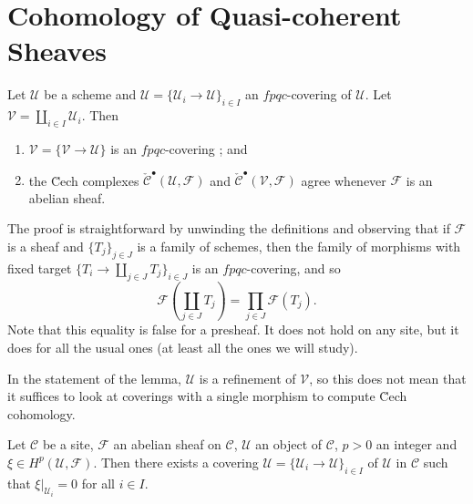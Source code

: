 \section{Cohomology of Quasi-coherent Sheaves}
\label{section-cohomology-quasi-coherent}

\begin{lemma}
\label{lem:CechComplexes}
Let $\mathcal{U}$ be a scheme and $\mathcal{U} = \{ \mathcal{U}_i \to 
\mathcal{U} \}_{i \in I}$ an $fpqc$-covering of $\mathcal{U}$. Let $\mathcal{V} 
= \coprod_{i \in I} \mathcal{U}_i$. Then
\begin{enumerate}
\item 
$\mathcal{V} = \{ \mathcal{V} \to \mathcal{U} \}$ is an $fpqc$-covering ; and
\item
the \u Cech complexes $\check{\mathcal{C}}^\bullet (\mathcal{U}, \mathcal{F})$ 
and $\check{\mathcal{C}}^\bullet (\mathcal{V}, \mathcal{F})$ agree whenever 
$\mathcal{F}$ is an abelian sheaf.
\end{enumerate} 
\end{lemma}

\noindent
The proof is straightforward by unwinding the definitions and observing that if 
$\mathcal{F}$ is a sheaf and $\{ T_j \}_{j \in J}$ is a family of schemes, then 
the family of morphisms with fixed target $\{ T_i \to \coprod_{j \in J} T_j 
\}_{i \in J}$ is an $fpqc$-covering, and so
$$
\mathcal{F} \left( \coprod_{j \in J} T_j \right) = \prod_{j \in J} 
\mathcal{F} (T_j).
$$
Note that this equality is false for a presheaf. It does not hold on any site, 
but it does for all the usual ones (at least all the ones we will study).

\begin{remark}
In the statement of the lemma, $\mathcal{U}$ is a refinement of $\mathcal{V}$, 
so this does not mean that it suffices to look at coverings with a single 
morphism to compute \u Cech cohomology.
\end{remark}

\begin{lemma} \label{lem:LocOfCohomology}
Let $\mathcal{C}$ be a site, $\mathcal{F}$ an abelian sheaf on $\mathcal{C}$, 
$\mathcal{U}$ an object of $\mathcal{C}$, $p >0$ an integer and $\xi \in 
H^p(\mathcal{U}, \mathcal{F})$. Then there exists a covering $\mathcal{U} = \{ 
\mathcal{U}_i \to \mathcal{U} \}_{i \in I}$ of $\mathcal{U}$ in $\mathcal{C}$ 
such that $\xi |_{\mathcal{U}_i} = 0$ for all $i \in I$.
\end{lemma}

